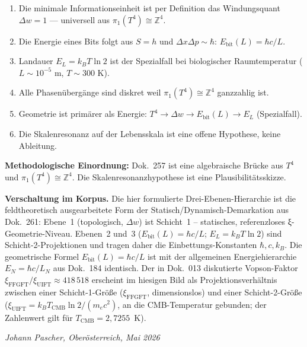 \begin{enumerate}
  \item Die minimale Informationseinheit ist per Definition das
        Windungsquant \(\Delta w = 1\) —
        universell aus \(\pi_1(T^4) \cong \mathbb{Z}^4\).
  \item Die Energie eines Bits folgt aus \(S = h\) und
        \(\Delta x\Delta p \sim \hbar\):
        \(E_\text{bit}(L) = \hbar c / L\).
  \item Landauer \(E_L = k_BT\ln2\) ist der Spezialfall
        bei biologischer Raumtemperatur (\(L \sim 10^{-5}\) m,
        \(T \sim 300\) K).
  \item Alle Phasenübergänge sind diskret weil
        \(\pi_1(T^4) \cong \mathbb{Z}^4\) ganzzahlig ist.
  \item Geometrie ist primärer als Energie:
        \(T^4 \to \Delta w \to E_\text{bit}(L) \to E_L\) (Spezialfall).
  \item Die Skalenresonanz auf der Lebensskala ist eine offene
        Hypothese, keine Ableitung.
\end{enumerate}

\bigskip
\noindent
\textbf{Methodologische Einordnung:}
Dok.~257 ist eine algebraische Brücke aus \(T^4\) und
\(\pi_1(T^4) \cong \mathbb{Z}^4\).
Die Skalenresonanzhypothese ist eine Plausibilitätsskizze.

\bigskip
\noindent
\textbf{Verschaltung im Korpus.}
Die hier formulierte Drei-Ebenen-Hierarchie ist die feldtheoretisch
ausgearbeitete Form der Statisch/Dynamisch-Demarkation aus Dok.~261:
Ebene~1 (topologisch, \(\Delta w\)) ist Schicht~1 -- statisches,
referenzloses ξ-Geometrie-Niveau. Ebenen~2 und~3
(\(E_\text{bit}(L) = \hbar c/L\); \(E_L = k_B T \ln 2\)) sind
Schicht-2-Projektionen und tragen daher die Einbettungs-Konstanten
\(\hbar, c, k_B\). Die geometrische Formel \(E_\text{bit}(L) = \hbar c/L\)
ist mit der allgemeinen Energiehierarchie \(E_N = \hbar c/L_N\) aus
Dok.~184 identisch. Der in Dok.~013 diskutierte Vopson-Faktor
\(\xi_\text{FFGFT}/\xi_\text{UIFT} \approx 418\,518\) erscheint im
hiesigen Bild als Projektionsverhältnis zwischen einer Schicht-1-Größe
(\(\xi_\text{FFGFT}\), dimensionslos) und einer Schicht-2-Größe
(\(\xi_\text{UIFT} = k_B T_\text{CMB}\ln 2/(m_e c^2)\), an die
CMB-Temperatur gebunden; der Zahlenwert gilt für \(T_\text{CMB} = 2{,}7255\)~K).

\bigskip
\begin{flushright}
\textit{Johann Pascher, Oberösterreich, Mai 2026}
\end{flushright}

